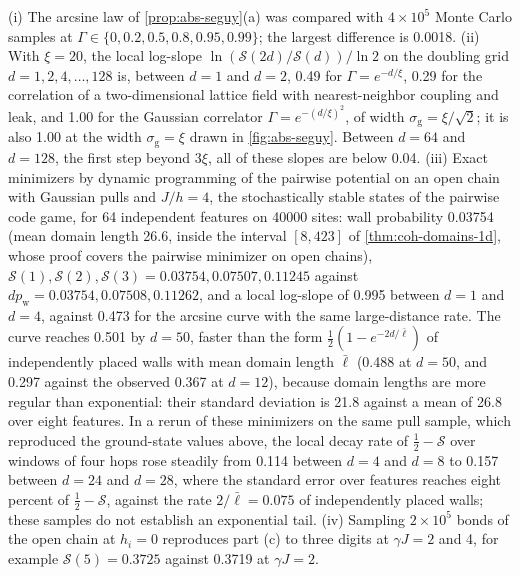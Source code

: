 \begin{numcheck}\label{chk:abs-seguy}
(i) The arcsine law of \cref{prop:abs-seguy}(a) was compared with $4\times10^5$ Monte Carlo samples at $\Gamma\in\{0,0.2,0.5,0.8,0.95,0.99\}$; the largest difference is 0.0018. (ii) With $\xi=20$, the local log-slope $\ln(\mathcal S(2d)/\mathcal S(d))/\ln2$ on the doubling grid $d=1,2,4,\dots,128$ is, between $d=1$ and $d=2$, 0.49 for $\Gamma=e^{-d/\xi}$, 0.29 for the correlation of a two-dimensional lattice field with nearest-neighbor coupling and leak, and 1.00 for the Gaussian correlator $\Gamma=e^{-(d/\xi)^2}$, of width $\sigma_{\mathrm g}=\xi/\sqrt2$; it is also 1.00 at the width $\sigma_{\mathrm g}=\xi$ drawn in \cref{fig:abs-seguy}. Between $d=64$ and $d=128$, the first step beyond $3\xi$, all of these slopes are below 0.04. (iii) Exact minimizers by dynamic programming of the pairwise potential on an open chain with Gaussian pulls and $J/h=4$, the stochastically stable states of the pairwise code game, for 64 independent features on 40000 sites: wall probability 0.03754 (mean domain length 26.6, inside the interval $[8,423]$ of \cref{thm:coh-domains-1d}, whose proof covers the pairwise minimizer on open chains), $\mathcal S(1),\mathcal S(2),\mathcal S(3)=0.03754,0.07507,0.11245$ against $dp_{\mathrm w}=0.03754,0.07508,0.11262$, and a local log-slope of 0.995 between $d=1$ and $d=4$, against 0.473 for the arcsine curve with the same large-distance rate. The curve reaches 0.501 by $d=50$, faster than the form $\frac12(1-e^{-2d/\bar\ell})$ of independently placed walls with mean domain length $\bar\ell$ (0.488 at $d=50$, and 0.297 against the observed 0.367 at $d=12$), because domain lengths are more regular than exponential: their standard deviation is 21.8 against a mean of 26.8 over eight features. In a rerun of these minimizers on the same pull sample, which reproduced the ground-state values above, the local decay rate of $\frac12-\mathcal S$ over windows of four hops rose steadily from 0.114 between $d=4$ and $d=8$ to 0.157 between $d=24$ and $d=28$, where the standard error over features reaches eight percent of $\frac12-\mathcal S$, against the rate $2/\bar\ell=0.075$ of independently placed walls; these samples do not establish an exponential tail. (iv) Sampling $2\times10^5$ bonds of the open chain at $h_i=0$ reproduces part (c) to three digits at $\gamma J=2$ and 4, for example $\mathcal S(5)=0.3725$ against 0.3719 at $\gamma J=2$.
\end{numcheck}

